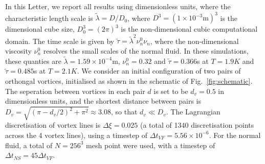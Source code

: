 \documentclass[%
superscriptaddress,
 amsmath,amssymb,
prl,
prb,
]{revtex4-2}
\begin{document}
In this Letter, we report all results using dimensionless units, where the characteristic length scale is $\tilde{\lambda} = D/D_0$, where $D^3=(1\times10^{-3}\mathrm{m})^3$ is the dimensional cube size, $D_0^3=(2\pi)^3$ is the non-dimensional cubic computational domain. The time scale is given by $\tilde{\tau}=\tilde{\lambda}^2\nu_n^0\nu_n$, where the non-dimensional viscosity $\nu_n^0$ resolves the small scales of the normal fluid. In these simulations, these quanties are $\tilde{\lambda}=1.59\times10^{-4}$m, $\nu_n^0=0.32$ and $\tilde{\tau}=0.366$s at $T=1.9K$ and $\tilde{\tau}=0.485$s at $T=2.1K$. We consider an initial configuration of two pairs of orthongal vortices, initialised as shown in the schematic of Fig.~\ref{fig:schematic}. The seperation between vortices in each pair $d$ is set to be $d_v=0.5$ in dimensionless units, and the shortest distance between pairs is $D_v=\sqrt{(\pi-d_v/2)^2+\pi^2}\approx 3.08$, so that $d_v\ll D_v$. The Lagrangian discretisation of vortex lines is $\Delta \xi = 0.025$ (a total of 1340 discretisation points across the 4 vortex lines), using a timestep of $\Delta t_{VF} = 5.56\times10^{-6}$. For the normal fluid, a total of $N=256^3$ mesh point were used, with a timestep of $\Delta t_{NS} = 45\Delta t_{VF}$. 

\end{document}
